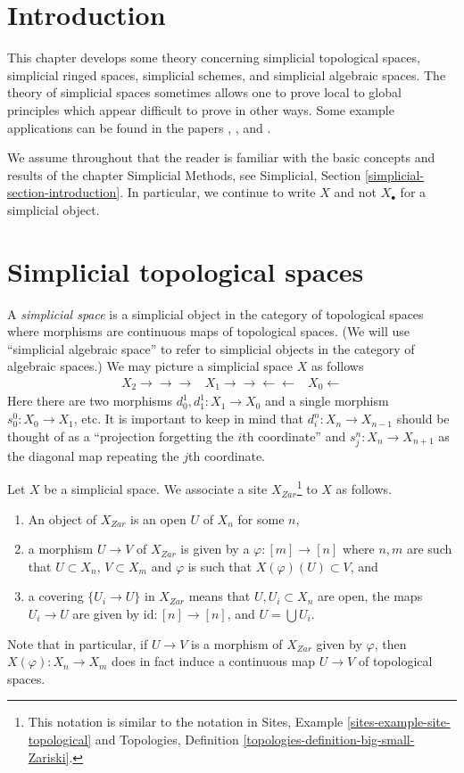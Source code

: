\section{Introduction}
\label{spaces-simplicial-section-introduction}
This chapter develops some theory concerning simplicial topological spaces,
simplicial ringed spaces, simplicial schemes, and simplicial algebraic spaces.
The theory of simplicial spaces sometimes allows one to prove local to global
principles which appear difficult to prove in other ways.
Some example applications can be found in the papers
\cite{faltings_finiteness}, \cite{Kiehl}, and \cite{HodgeIII}.

\medskip\noindent
We assume throughout that the reader is familiar with the basic concepts
and results of the chapter Simplicial Methods, see
Simplicial, Section \ref{simplicial-section-introduction}.
In particular, we continue to write $X$ and not $X_\bullet$
for a simplicial object.

\section{Simplicial topological spaces}
\label{spaces-simplicial-section-simplicial-top}
A {\it simplicial space} is a simplicial object in the category of
topological spaces where morphisms are continuous maps of topological
spaces. (We will use ``simplicial algebraic space'' to refer to simplicial
objects in the category of algebraic spaces.)
We may picture a simplicial space $X$ as follows
$$
\begin{array}{ccc}X_2
\longrightarrow\longrightarrow\longrightarrow & X_1
\longrightarrow\longrightarrow\longleftarrow\longleftarrow & X_0
\longleftarrow\end{array}
$$
Here there are two morphisms $d^1_0, d^1_1 : X_1 \to X_0$
and a single morphism $s^0_0 : X_0 \to X_1$, etc.
It is important to keep in mind that $d^n_i : X_n \to X_{n - 1}$
should be thought of as a ``projection forgetting the
$i$th coordinate'' and $s^n_j : X_n \to X_{n + 1}$ as the diagonal
map repeating the $j$th coordinate.

\medskip\noindent
Let $X$ be a simplicial space. We associate a site
$X_{Zar}$\footnote{This notation is similar to the notation in
Sites, Example \ref{sites-example-site-topological}
and
Topologies, Definition \ref{topologies-definition-big-small-Zariski}.}
to $X$ as follows.
\begin{enumerate}
\item An object of $X_{Zar}$ is an open $U$ of $X_n$ for some $n$,
\item a morphism $U \to V$ of $X_{Zar}$ is given by a
$\varphi : [m] \to [n]$ where $n, m$ are such that
$U \subset X_n$, $V \subset X_m$ and $\varphi$ is such that
$X(\varphi)(U) \subset V$, and
\item a covering $\{U_i \to U\}$ in $X_{Zar}$ means
that $U, U_i \subset X_n$ are open, the maps $U_i \to U$ are
given by $\text{id} : [n] \to [n]$, and $U = \bigcup U_i$.
\end{enumerate}
Note that in particular, if $U \to V$ is a morphism of $X_{Zar}$
given by $\varphi$, then $X(\varphi) : X_n \to X_m$ does in fact
induce a continuous map $U \to V$ of topological spaces.

